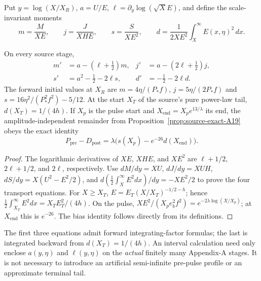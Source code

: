 Put $y=\log(X/X_R)$,
$a=U/E$, $\ell=\partial_y\log(\sqrt XE)$,
and define the scale-invariant moments
\[
m=\frac{M}{XE},\qquad j=\frac{J}{XHE},\qquad
s=\frac{S}{XE^2},\qquad
d=\frac1{2XE^2}\int_X^\infty E(x,\eta)^2\,dx.
\]
\begin{theorem}\label{thm:four-moment-transport}
On every source stage,
\begin{equation}\label{eq:four-moment-transport}
\begin{aligned}
m'&=a-(\ell+\tfrac12)m,&
j'&=a-(2\ell+\tfrac12)j,\\
s'&=a^2-\tfrac12-2\ell s,&
d'&=-\tfrac12-2\ell d.
\end{aligned}
\end{equation}
The forward initial values at $X_R$ are
$m=4\eta/(P_*f)$,
$j=5\eta/(2P_*f)$ and
$s=16\eta^2/(P_*^2f^2)-5/12$.
At the start $X_T$ of the source's pure power-law tail,
$d(X_T)=1/(4h)$.
If $X_p$ is the pulse start and
$X_{\mathrm{end}}=X_pe^{13/\lambda}$ its end, the
amplitude-independent remainder from Proposition~\ref{prop:source-exact-A19}
obeys the exact identity
\begin{equation}\label{eq:source-bias-transport}
P_{\mathrm{pre}}-D_{\mathrm{post}}
=\lambda\bigl(s(X_p)-e^{-26}d(X_{\mathrm{end}})\bigr).
\end{equation}
\end{theorem}
\begin{proof}
The logarithmic derivatives of $XE$, $XHE$, and $XE^2$
are $\ell+1/2$, $2\ell+1/2$, and $2\ell$,
respectively. Use $dM/dy=XU$,
$dJ/dy=XUH$,
$dS/dy=X(U^2-E^2/2)$, and
$d(\frac12\int_X^\infty E^2dx)/dy=-XE^2/2$
to prove the four transport equations.
For $X\ge X_T$, $E=E_T(X/X_T)^{-1/2-h}$;
hence $\frac12\int_{X_T}^\infty E^2dx=X_TE_T^2/(4h)$.
On the pulse,
$XE^2/(X_pe_b^2f^2)=e^{-2\lambda\log(X/X_p)}$;
at $X_{\mathrm{end}}$ this is $e^{-26}$. The bias
identity follows directly from its definitions.
\end{proof}
The first three equations admit forward integrating-factor
formulas; the last is integrated backward from $d(X_T)=1/(4h)$.
An interval calculation need only enclose $a(y,\eta)$ and
$\ell(y,\eta)$ on the \emph{actual} finitely many Appendix-A
stages. It is not necessary to introduce an artificial
semi-infinite pre-pulse profile or an approximate terminal tail.

